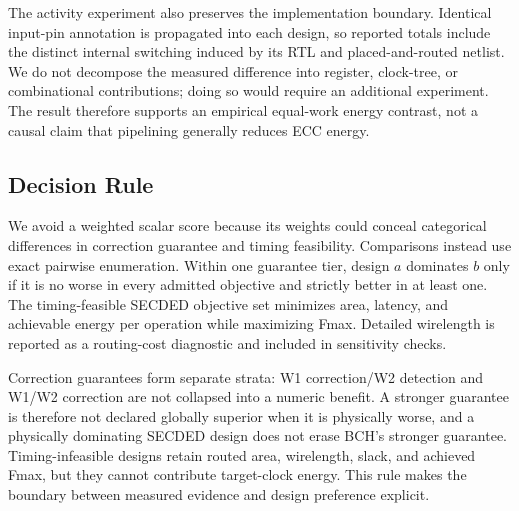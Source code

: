 The activity experiment also preserves the implementation boundary. Identical input-pin annotation is propagated into each design, so reported totals include the distinct internal switching induced by its RTL and placed-and-routed netlist. We do not decompose the measured difference into register, clock-tree, or combinational contributions; doing so would require an additional experiment. The result therefore supports an empirical equal-work energy contrast, not a causal claim that pipelining generally reduces ECC energy.

\subsection{Decision Rule}

We avoid a weighted scalar score because its weights could conceal categorical differences in correction guarantee and timing feasibility. Comparisons instead use exact pairwise enumeration. Within one guarantee tier, design $a$ dominates $b$ only if it is no worse in every admitted objective and strictly better in at least one. The timing-feasible SECDED objective set minimizes area, latency, and achievable energy per operation while maximizing Fmax. Detailed wirelength is reported as a routing-cost diagnostic and included in sensitivity checks.

Correction guarantees form separate strata: W1 correction/W2 detection and W1/W2 correction are not collapsed into a numeric benefit. A stronger guarantee is therefore not declared globally superior when it is physically worse, and a physically dominating SECDED design does not erase BCH's stronger guarantee. Timing-infeasible designs retain routed area, wirelength, slack, and achieved Fmax, but they cannot contribute target-clock energy. This rule makes the boundary between measured evidence and design preference explicit.
